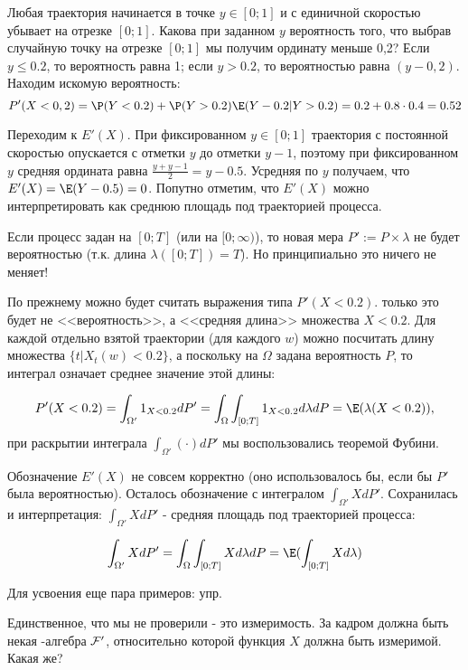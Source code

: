 {\begin{itemize}
Любая траектория начинается в точке $y\in[0;1]$ и с единичной скоростью убывает на отрезке $[0;1]$. Какова при заданном $y$ вероятность того, что выбрав случайную точку на отрезке $[0;1]$ мы получим ординату меньше 0,2? Если $y\leq 0.2$, то вероятность равна 1; если $y>0.2$, то вероятностью равна $(y-0,2)$. Находим искомую вероятность: 
\begin{equation} 
P'(X<0,2)=\P(Y<0.2)+\P(Y>0.2)\E(Y-0.2|Y>0.2)=0.2+0.8\cdot 0.4=0.52
\end{equation}

Переходим к $E'(X)$. При фиксированном $y\in[0;1]$ траектория с постоянной скоростью опускается с отметки $y$ до отметки $y-1$, поэтому при фиксированном $y$ средняя ордината равна $\frac{y+y-1}{2}=y-0.5$. Усредняя по $y$ получаем, что $E'(X)=\E(Y-0.5)=0$. Попутно отметим, что $E'(X)$ можно интерпретировать как среднюю площадь под траекторией процесса.
\end{itemize}

Если процесс задан на $[0;T]$ (или на $[0;\infty)$), то новая мера $P':=P\times\lambda$ не будет вероятностью (т.к. длина $\lambda([0;T])=T$). Но принципиально это ничего не меняет! 

По прежнему можно будет считать выражения типа $P'(X<0.2)$. только это будет не <<вероятность>>, а <<средняя длина>> множества $X<0.2$. Для каждой отдельно взятой траектории (для каждого $w$) можно посчитать длину множества $\{t|X_{t}(w)<0.2\}$, а поскольку на $\Omega$ задана вероятность $P$, то интеграл означает среднее значение этой длины:

\begin{equation} 
P'(X<0.2)=\int_{\Omega'}1_{X<0.2}dP'=\int_{\Omega}\int_{[0;T]}1_{X<0.2}d\lambda dP=\E(\lambda(X<0.2)),
\end{equation}
при раскрытии интеграла $\int_{\Omega'}(\cdot)dP'$ мы воспользовались теоремой Фубини.

Обозначение $E'(X)$ не совсем корректно (оно использовалось бы, если бы $P'$ была вероятностью). Осталось обозначение с интегралом $\int_{\Omega'}XdP'$. Сохранилась и интерпретация:  $\int_{\Omega'}XdP'$ - средняя площадь под траекторией процесса:

\begin{equation}
\int_{\Omega'}XdP'=\int_{\Omega}\int_{[0;T]}Xd\lambda dP=\E(\int_{[0;T]}Xd\lambda)
\end{equation}

Для усвоения еще пара примеров:  упр.

Единственное, что мы не проверили - это измеримость. За кадром должна быть некая \s-алгебра $\mathcal{F}'$, относительно которой функция $X$ должна быть измеримой. Какая же?

}
